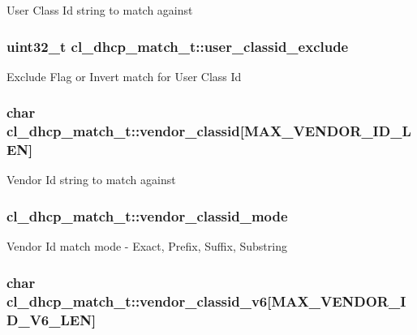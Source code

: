 User Class Id string to match against \hypertarget{structcl__dhcp__match__t_a4a9acef87783b241f88bfb9406401b51}{
\subsubsection[{user\-\_\-classid\-\_\-exclude}]{\setlength{\rightskip}{0pt plus 5cm}uint32\-\_\-t cl\-\_\-dhcp\-\_\-match\-\_\-t\-::user\-\_\-classid\-\_\-exclude}}\label{structcl__dhcp__match__t_a4a9acef87783b241f88bfb9406401b51}
Exclude Flag or Invert match for User Class Id \hypertarget{structcl__dhcp__match__t_a34232c984c0714c21469ae1194f2270f}{
\subsubsection[{vendor\-\_\-classid}]{\setlength{\rightskip}{0pt plus 5cm}char cl\-\_\-dhcp\-\_\-match\-\_\-t\-::vendor\-\_\-classid\mbox{[}{\bf M\-A\-X\-\_\-\-V\-E\-N\-D\-O\-R\-\_\-\-I\-D\-\_\-\-L\-E\-N}\mbox{]}}}\label{structcl__dhcp__match__t_a34232c984c0714c21469ae1194f2270f}
Vendor Id string to match against \hypertarget{structcl__dhcp__match__t_ae881ec5da3e1f70dbb600f526c5698e0}{
\subsubsection[{vendor\-\_\-classid\-\_\-mode}]{ cl\-\_\-dhcp\-\_\-match\-\_\-t\-::vendor\-\_\-classid\-\_\-mode}}\label{structcl__dhcp__match__t_ae881ec5da3e1f70dbb600f526c5698e0}
Vendor Id match mode -\/ Exact, Prefix, Suffix, Substring \hypertarget{structcl__dhcp__match__t_a09ecab3ee355fd73a5898de14c86d20d}{
\subsubsection[{vendor\-\_\-classid\-\_\-v6}]{\setlength{\rightskip}{0pt plus 5cm}char cl\-\_\-dhcp\-\_\-match\-\_\-t\-::vendor\-\_\-classid\-\_\-v6\mbox{[}{\bf M\-A\-X\-\_\-\-V\-E\-N\-D\-O\-R\-\_\-\-I\-D\-\_\-\-V6\-\_\-\-L\-E\-N}\mbox{]}}}\label{structcl__dhcp__match__t_a09ecab3ee355fd73a5898de14c86d20d}
